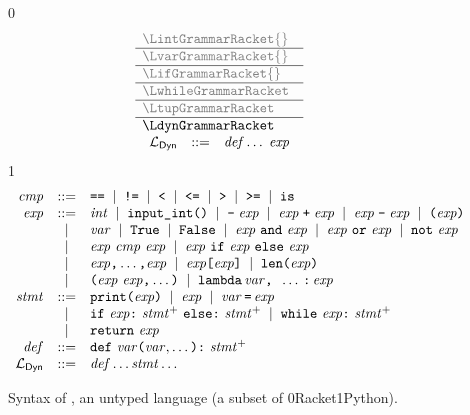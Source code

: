 \documentclass[7x10]{TimesAPriori_MIT}%
\newcommand{\gray}[1]{{\color{gray} #1}}
\def\racketEd{0}
\def\pythonEd{1}
\def\edition{1}
\newcommand{\racket}[1]{{\if\edition\racketEd{#1}\fi}}
\newcommand{\pythonColor}[0]{}
\newcommand{\python}[1]{{\if\edition\pythonEd\pythonColor #1\fi}}
\numberwithin{theorem}{chapter}
\numberwithin{definition}{chapter}
\numberwithin{equation}{chapter}
\begin{document}
\begin{figure}[tp]
  \centering
  \begin{tcolorbox}[colback=white]  
    \small
{\if\edition\racketEd    
\[
\begin{array}{l}
  \gray{\LintGrammarRacket{}} \\ \hline
  \gray{\LvarGrammarRacket{}} \\ \hline
  \gray{\LifGrammarRacket{}} \\ \hline
  \gray{\LwhileGrammarRacket} \\ \hline
  \gray{\LtupGrammarRacket} \\ \hline
  \LdynGrammarRacket \\
\begin{array}{rcl}
\LangDynM{}  &::=& \Def\ldots\; \Exp
\end{array}
\end{array}
\]
\fi}
{\if\edition\pythonEd\pythonColor
\[
\begin{array}{rcl}
  \mathit{cmp} &::= & \texttt{==} \;\mid\; \texttt{!=} \;\mid\; \texttt{<} \;\mid\; \texttt{<=} \;\mid\; \texttt{>} \;\mid\; \texttt{>=} \;\mid\; \texttt{is} \\
  \mathit{exp} &::=& \mathit{int} \;\mid\; \texttt{input\_int}\texttt{(}\texttt{)} \;\mid\; \texttt{-}\;\mathit{exp} \;\mid\; \mathit{exp} \; \texttt{+} \; \mathit{exp} \;\mid\; \mathit{exp} \; \texttt{-} \; \mathit{exp} \;\mid\; \texttt{(}\mathit{exp}\texttt{)} \\
  &\;\mid\;& \mathit{var}{} \;\mid\; \texttt{True} \;\mid\; \texttt{False} \;\mid\; \mathit{exp}~\texttt{and}~\mathit{exp}
  \;\mid\; \mathit{exp}~\texttt{or}~\mathit{exp} \;\mid\; \texttt{not}~\mathit{exp} \\
  &\;\mid\;& \mathit{exp}~\mathit{cmp}~\mathit{exp}
      \;\mid\; \mathit{exp}~\texttt{if}~\mathit{exp}~\texttt{else}~\mathit{exp} \\
  &\;\mid\;& \mathit{exp} \texttt{,} \ldots \texttt{,} \mathit{exp} \;\mid\; \mathit{exp} \texttt{[} \mathit{exp} \texttt{]}
      \;\mid\; \texttt{len}\texttt{(} \mathit{exp} \texttt{)}  \\
   &\;\mid\;& \texttt{(}\mathit{exp}~\mathit{exp}\texttt{,} \ldots\texttt{)} 
    \;\mid\; \texttt{lambda}\,\mathit{var}\texttt{, }\ldots\,\texttt{:}\,\mathit{exp}\\
  \mathit{stmt} &::=& \texttt{print}\texttt{(} \mathit{exp} \texttt{)} \;\mid\; \mathit{exp} 
    \;\mid\; \mathit{var}\mathop{\texttt{=}}\mathit{exp} \\
   &\;\mid\;& \texttt{if}~ \mathit{exp} \texttt{:}~ \mathit{stmt}^{+} ~\texttt{else:}~ \mathit{stmt}^{+} 
   \;\mid\; \texttt{while}~ \mathit{exp} \texttt{:}~ \mathit{stmt}^{+} \\
    &\;\mid\;& \texttt{return}~\mathit{exp} \\
   \mathit{def} &::=& \texttt{def}~\mathit{var}\texttt{(} \mathit{var}{,} \ldots \texttt{)} \texttt{:}~\mathit{stmt}^{+} \\
  \mathcal{L}_{\mathsf{Dyn}}{} &::=& \mathit{def}\ldots \mathit{stmt}\ldots
\end{array}
\]
\fi}
  \end{tcolorbox}
\caption{Syntax of \LangDyn{}, an untyped language (a subset of \racket{Racket}\python{Python}).}
\label{fig:r7-concrete-syntax}
\end{figure}
\end{document}
